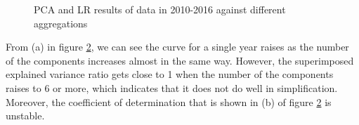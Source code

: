 \documentclass{mcmthesis}
\begin{document}
\begin{figure}[H]
\begin{subfigure}[b]{0.49\textwidth}
        \label{fig:pca_year_score}
    \end{subfigure}
    \caption{PCA and LR results of data in 2010-2016 against different aggregations}\label{fig:pca_year}
\end{figure}

From (a) in figure \ref{fig:pca_year}, we can see the curve for a single year raises as the number of the components increases almost in the same way. However, the superimposed explained variance ratio gets close to 1 when the number of the components raises to 6 or more, which indicates that it does not do well in simplification. Moreover, the coefficient of determination that is shown in (b) of figure \ref{fig:pca_year} is unstable.

~\smallskip
\end{document}
